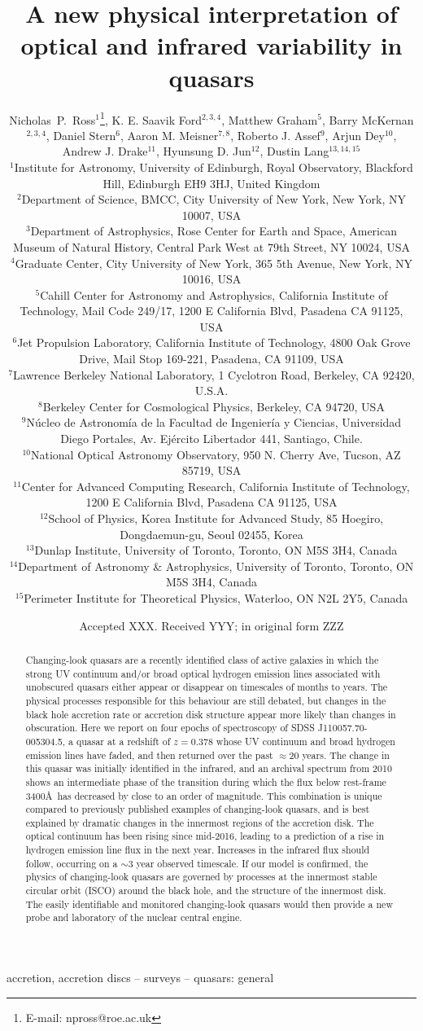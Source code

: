 \documentclass[a4paper,fleqn,usenatbib]{mnras}
\title[Variability in J1100-0053]{A new physical interpretation of optical and infrared variability in quasars}
\author[N.P. Ross et al.]
{Nicholas~P.~Ross$^{1}$\thanks{E-mail: npross@roe.ac.uk},    
K. E. Saavik Ford$^{2,3,4}$,  Matthew Graham$^{5}$,  Barry McKernan$^{2,3,4}$,  
\newauthor Daniel Stern$^{6}$, Aaron M. Meisner$^{7,8}$, Roberto J. Assef$^{9}$, 
Arjun Dey$^{10}$, Andrew J. Drake$^{11}$, 
\newauthor Hyunsung D. Jun$^{12}$, Dustin Lang$^{13,14,15}$
\\
$^{1}$Institute for Astronomy, University of Edinburgh, Royal Observatory, Blackford Hill, Edinburgh EH9 3HJ, United Kingdom \\
$^{2}$Department of Science, BMCC, City University of New York, New York, NY 10007, USA \\
$^{3}$Department of Astrophysics, Rose Center for Earth and Space, American Museum of Natural History, Central Park West at 79th Street, NY 10024, USA \\
$^{4}$Graduate Center, City University of New York, 365 5th Avenue, New York, NY 10016, USA\\
$^{5}$Cahill Center for Astronomy and Astrophysics, California Institute of Technology, Mail Code 249/17, 1200 E California Blvd, Pasadena CA 91125, USA\\
$^{6}$Jet Propulsion Laboratory, California Institute of Technology, 4800 Oak Grove Drive, Mail Stop 169-221, Pasadena, CA 91109, USA \\
$^{7}$Lawrence Berkeley National Laboratory, 1 Cyclotron Road, Berkeley, CA 92420, U.S.A. \\
$^{8}$Berkeley Center for Cosmological Physics, Berkeley, CA 94720, USA\\
$^{9}$N\'ucleo de Astronom\'ia de la Facultad de Ingenier\'ia y Ciencias, Universidad Diego Portales, Av. Ej\'ercito Libertador 441, Santiago, Chile.\\
$^{10}$National Optical Astronomy Observatory, 950 N. Cherry Ave, Tucson, AZ 85719, USA \\
$^{11}$Center for Advanced Computing Research, California Institute of Technology, 1200 E California Blvd, Pasadena CA 91125, USA \\
$^{12}$School of Physics, Korea Institute for Advanced Study, 85 Hoegiro, Dongdaemun-gu, Seoul 02455, Korea\\
$^{13}$Dunlap Institute, University of Toronto, Toronto, ON M5S 3H4, Canada \\
$^{14}$Department of Astronomy \& Astrophysics, University of Toronto, Toronto, ON M5S 3H4, Canada \\
$^{15}$Perimeter Institute for Theoretical Physics, Waterloo, ON N2L 2Y5, Canada\\
}
\date{Accepted XXX. Received YYY; in original form ZZZ}
\begin{document}
\label{firstpage}
\pagerange{\pageref{firstpage}--\pageref{lastpage}}
\maketitle


\begin{abstract}
Changing-look quasars are a recently identified class of active
galaxies in which the strong UV continuum and/or broad optical
hydrogen emission lines associated with unobscured quasars either
appear or disappear on timescales of months to years.  The physical
processes responsible for this behaviour are still debated, but
changes in the black hole accretion rate or accretion disk structure
appear more likely than changes in obscuration.  Here we report on
four epochs of spectroscopy of SDSS J110057.70-005304.5, a quasar at a
redshift of $z=0.378$ whose UV continuum and broad hydrogen emission
lines have faded, and then returned over the past $\approx$20
years. The change in this quasar was initially identified in the
infrared, and an archival spectrum from 2010 shows an intermediate
phase of the transition during which the flux below rest-frame
3400\AA\ has decreased by close to an order of magnitude. This
combination is unique compared to previously published examples of
changing-look quasars, and is best explained by dramatic changes in
the innermost regions of the accretion disk. The optical continuum has
been rising since mid-2016, leading to a prediction of a rise in
hydrogen emission line flux in the next year. Increases in the
infrared flux should follow, occurring on a $\sim$3 year observed
timescale. If our model is confirmed, the physics of changing-look
quasars are governed by processes at the innermost stable circular
orbit (ISCO) around the black hole, and the structure of the innermost
disk. The easily identifiable and monitored changing-look quasars
would then provide a new probe and laboratory of the nuclear central
engine.
\end{abstract}

\begin{keywords}
accretion, accretion discs -- surveys -- quasars: general
\end{keywords}




\end{document}
